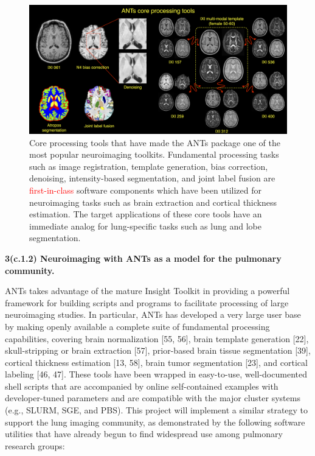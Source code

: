 \documentclass[11pt,]{article}
\begin{document}
\begin{figure}[htbp]
\centering
\includegraphics{Figs/coreANtsToolsNeuro.png}
\caption{Core processing tools that have made the ANTs package one of
the most popular neuroimaging toolkits. Fundamental processing tasks
such as image registration, template generation, bias correction,
denoising, intensity-based segmentation, and joint label fusion are
\textcolor{red}{first-in-class} software components which have been
utilized for neuroimaging tasks such as brain extraction and cortical
thickness estimation. The target applications of these core tools have
an immediate analog for lung-specific tasks such as lung and lobe
segmentation.}
\end{figure}

\textbf{3(c.1.2) Neuroimaging with ANTs as a model for the pulmonary
community.}

ANTs takes advantage of the mature Insight Toolkit in providing a
powerful framework for building scripts and programs to facilitate
processing of large neuroimaging studies. In particular, ANTs has
developed a very large user base by making openly available a complete
suite of fundamental processing capabilities, covering brain
normalization {[}55, 56{]}, brain template generation {[}22{]},
skull-stripping or brain extraction {[}57{]}, prior-based brain tissue
segmentation {[}39{]}, cortical thickness estimation {[}13, 58{]}, brain
tumor segmentation {[}23{]}, and cortical labeling {[}46, 47{]}. These
tools have been wrapped in easy-to-use, well-documented shell scripts
that are accompanied by online self-contained examples with
developer-tuned parameters and are compatible with the major cluster
systems (e.g., SLURM, SGE, and PBS). This project will implement a
similar strategy to support the lung imaging community, as demonstrated
by the following software utilities that have already begun to find
widespread use among pulmonary research groups:
\end{document}
